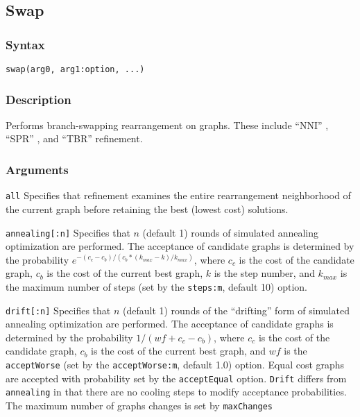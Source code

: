 \documentclass[11pt]{article}
\begin{document}
	\subsection{Swap} 
		\subsubsection{Syntax}
			\texttt{swap(arg0, arg1:option, ...)}
			
		\subsubsection{Description}
		Performs branch-swapping rearrangement on graphs.  These include ``NNI'' \citep{CaminandSokal1965, Robinson1971}, ``SPR''  \citep{Dayhoff1969}, and ``TBR''  \citep{Farris1988, swofford1990a}  refinement.
		
		\subsubsection{Arguments}
		\noindent \texttt{all} Specifies that refinement examines the entire rearrangement neighborhood of the current graph before retaining the best (lowest cost) solutions.
		
		\smallskip		
		\noindent \texttt{annealing[:n]} Specifies that $n$ (default 1) rounds of simulated annealing \citep{Metropolisetal1953, Kirkpatricketal1983, Cerny1985} optimization are performed.  The acceptance 
		of candidate graphs is determined by the probability $e ^ {- (c_c - c_b)/ (c_b * (k_{max} -k)/ k_{max})}$, where
		$c_c$ is the cost of the candidate graph, $c_b$ is the cost of the current best graph, $k$ is the step number,  
		and $k_{max}$ is the maximum number of steps (set by the \texttt{steps:m}, default 10) option.
		
		\smallskip		
		\noindent \texttt{drift[:n]} Specifies that $n$ (default 1) rounds of the ``drifting'' form of simulated annealing \citep{goloboff1999} optimization are performed.  The acceptance 
		of candidate graphs is determined by the probability $1/ (wf + c_c - c_b)$, where
		$c_c$ is the cost of the candidate graph, $c_b$ is the cost of the current best graph,   
		and $wf$ is the \texttt{acceptWorse} (set by the \texttt{acceptWorse:m}, default 1.0) option. Equal cost graphs are accepted 
		with probability set by the \texttt{acceptEqual} option.  \texttt{Drift} differs from \texttt{annealing} in that there are no cooling steps to modify acceptance probabilities. The maximum number of graphs changes is set by \texttt{maxChanges}
		
\end{document}
